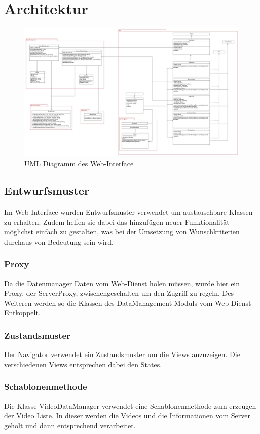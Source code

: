 \section{Architektur}
\begin{figure}[ht]
	\centering
\includegraphics[width=1\textwidth]{./resources/Diagramme/WebInterface/UMLWebInterface.jpg}
\caption{UML Diagramm des Web-Interface}
	\label{interface:fig:modules_overview}
\end{figure}

\subsection{Entwurfsmuster}
Im Web-Interface wurden Entwurfsmuster verwendet um austauschbare Klassen zu erhalten. Zudem helfen sie dabei das hinzufügen neuer Funktionalität möglichst einfach zu gestalten, was bei der Umsetzung von Wunschkriterien durchaus von Bedeutung sein wird.

\subsubsection{Proxy}
Da die Datenmanager Daten vom Web-Dienst holen müssen, wurde hier ein Proxy, der ServerProxy, zwischengeschalten um den Zugriff zu regeln. Des Weiteren werden so die Klassen des DataManagement Moduls vom Web-Dienst Entkoppelt.

\subsubsection{Zustandsmuster}
Der Navigator verwendet ein Zustandsmuster um die Views anzuzeigen. Die verschiedenen Views entsprechen dabei den States.

\subsubsection{Schablonenmethode}
Die Klasse VideoDataManager verwendet eine Schablonenmethode zum erzeugen der Video Liste. In dieser werden die Videos und die Informationen vom Server geholt und dann entsprechend verarbeitet.
\newpage
